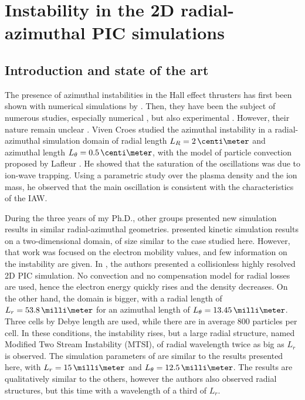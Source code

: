 
\section{Instability in the \acs{2D} radial-azimuthal \acs{PIC} simulations}
  \label{sec-PIC-ECDI}
  
  \subsection{Introduction and state of the art} \label{subsec-indroECDI}
        
    The presence of azimuthal instabilities in the Hall effect thrusters has first been shown with numerical simulations by \citet{adam2004}.
    Then, they have been the subject of numerous studies, especially numerical \citep{ducrocq2006,lafleur2016,lafleur2016a,croes2017,croes2018,janhunen2018,taccogna2019}, but also experimental \citep{honore2011,cavalier2013,cavalier2013a}.
    However, their nature remain unclear \citep{boeuf2018}.
    Viven Croes studied the azimuthal instability in a radial-azimuthal simulation domain of radial length $L_R=2\,\centi\meter$ and azimuthal length $L_{\theta}=0.5\,\centi\meter$, with the model of particle convection proposed by Lafleur \citep{croes2017,croes2018}.
    He showed that the saturation of the oscillations was due to ion-wave trapping.
    Using a parametric study over the plasma density and the ion mass, he observed that the main oscillation is consistent with the characteristics of the \ac{IAW}.
    
    During the three years of my Ph.D., other groups presented new simulation results in similar radial-azimuthal geometries.
    \citet{hara2019a} presented kinetic simulation results on a two-dimensional domain, of size similar to the case studied here.
    However, that work was focused on the electron mobility values, and few information on the instability are given.
    In \citet{janhunen2018}, the authors presented a collisionless highly resolved \ac{2D} \ac{PIC} simulation.
    No convection and no compensation model for radial losses are used, hence the electron energy quickly rises and the density decreases.
    On the other hand, the domain is bigger, with a radial length of $L_r = 53.8\,\milli\meter$ for an azimuthal length of $L_{\theta} = 13.45 \,\milli\meter$.
    Three cells by Debye length are used, while there are in average 800 particles per cell.
    In these conditions, the instability rises, but a large radial structure, named Modified Two Stream Instability (MTSI), of radial wavelength twice as big as $L_r$  is observed.
    The simulation parameters of \citet{taccogna2019} are similar to the results presented here, with  $L_r = 15\,\milli\meter$ and $L_{\theta} = 12.5 \,\milli\meter$.
    The results are qualitatively similar to the others, however the authors also observed radial structures, but this time with a wavelength of a third of $L_r$.
        

